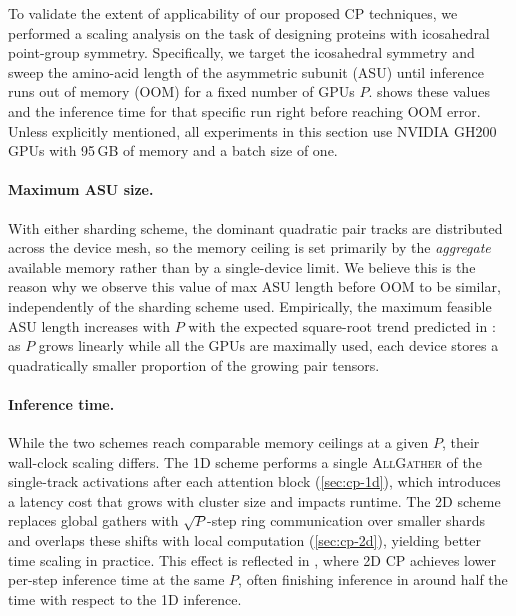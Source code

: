 To validate the extent of applicability of our proposed CP techniques, 
we performed a scaling analysis on the task of designing proteins with icosahedral
point-group symmetry. Specifically, we target the icosahedral symmetry and sweep the 
amino-acid length of the asymmetric subunit (ASU) until inference runs out of memory (OOM)
for a fixed number of GPUs $P$.  shows these values and the inference 
time for that specific run right before reaching OOM error. Unless explicitly mentioned,
all experiments in this section use NVIDIA GH200 GPUs with 95\,GB of memory and a batch size of
one.

\paragraph{Maximum ASU size.}
With either sharding scheme, the dominant quadratic pair tracks are distributed across 
the device mesh, so the memory ceiling is set primarily by the \emph{aggregate} available 
memory rather than by a single-device limit.  We believe this is the reason why we observe 
this value of max ASU length before OOM to be similar, independently of the sharding scheme
used.  Empirically, the maximum feasible ASU length increases with $P$ with the expected 
square-root trend predicted in : as $P$ grows linearly while all the 
GPUs are maximally used, each device stores a quadratically smaller proportion of the 
growing pair tensors. 

\paragraph{Inference time.}
While the two schemes reach comparable memory ceilings at a given $P$, their wall-clock 
scaling differs. The 1D scheme performs a single \textsc{AllGather} of the single-track 
activations after each attention block (\cref{sec:cp-1d}), which introduces a latency cost 
that grows with cluster size and impacts runtime. The 2D scheme replaces global gathers 
with $\sqrt{P}$-step ring communication over smaller shards and overlaps these shifts with 
local computation (\cref{sec:cp-2d}), yielding better time scaling in practice. This effect is 
reflected in , where 2D CP achieves lower per-step inference time at the 
same $P$, often finishing inference in around half the time with respect to the 1D inference.



